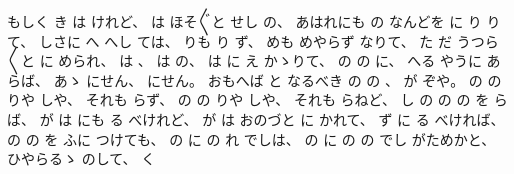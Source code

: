 もしく
き
は
けれど、
%
は
ほそ〴〵と
せし
の、
%
あはれにも
の
なんどを
に
り
りて、
%
しさに
へ
%
へし
ては、
%
りも
り
ず、
%
めも
めやらず
なりて、
%
た
だ%
うつら〳〵と
に
められ、
%
は
、%
%
は
の、
%
は%
に
え
かゝりて、%
%
の
の
に、
%
へる
やうに
あらば、
%
あゝ%
にせん、
%
にせん。
%
おもへば
と
なるべき
の
の
、
%
が
ぞや。
%
の
の
りや
しや、
%
それも
らず、
%
の
の
りや
しや、
%
それも
らねど、
%
し
の
の
の
を
らば、
%
が
は
にも%
る
べけれど、
%
が
は
%
おのづと
に
かれて、
%
ず
に
る
べければ、
%
の
の
を
ふに
つけても、
%
の
に
の
れ
でしは、
%
の
に
の
の
でし
がためかと、
%
ひやらるゝ%
のして、%
%
く
